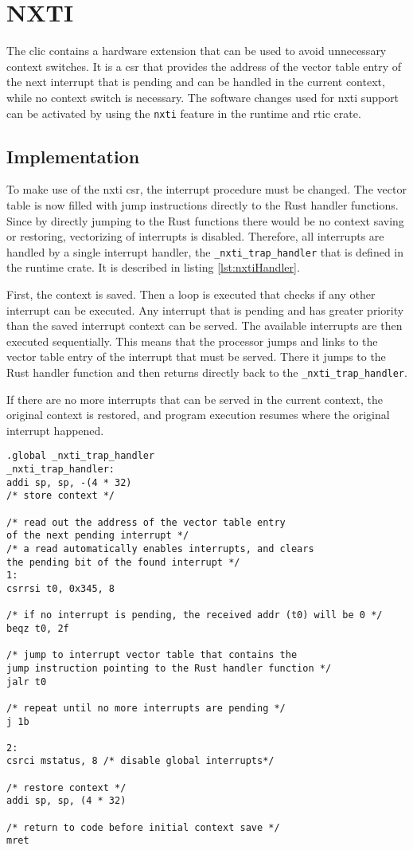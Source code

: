 \section{NXTI}
The \gls{clic} contains a hardware extension that can be used to avoid unnecessary context switches. It is a \gls{csr} that provides the address of the vector table entry of the next interrupt that is pending and can be handled in the current context, while no context switch is necessary. The software changes used for nxti support can be activated by using the \texttt{nxti} feature in the runtime and \gls{rtic} crate.

\subsection{Implementation}
To make use of the nxti \gls{csr}, the interrupt procedure must be changed. The vector table is now filled with jump instructions directly to the Rust handler functions. Since by directly jumping to the Rust functions there would be no context saving or restoring, vectorizing of interrupts is disabled. Therefore, all interrupts are handled by a single interrupt handler, the \texttt{_nxti_trap_handler} that is defined in the runtime crate. It is described in listing \ref{lst:nxtiHandler}.

First, the context is saved. Then a loop is executed that checks if any other interrupt can be executed. Any interrupt that is pending and has greater priority than the saved interrupt context can be served. The available interrupts are then executed sequentially. This means that the processor jumps and links to the vector table entry of the interrupt that must be served. There it jumps to the Rust handler function and then returns directly back to the \texttt{_nxti_trap_handler}.

If there are no more interrupts that can be served in the current context, the original context is restored, and program execution resumes where the original interrupt happened.

\begin{lstlisting}[language={[RISC-V]Assembler}, caption={Nxti Trap Handler}, label={lst:nxtiHandler}]
.global _nxti_trap_handler
_nxti_trap_handler:
addi sp, sp, -(4 * 32)
/* store context */

/* read out the address of the vector table entry
of the next pending interrupt */
/* a read automatically enables interrupts, and clears
the pending bit of the found interrupt */
1:
csrrsi t0, 0x345, 8

/* if no interrupt is pending, the received addr (t0) will be 0 */
beqz t0, 2f

/* jump to interrupt vector table that contains the
jump instruction pointing to the Rust handler function */
jalr t0

/* repeat until no more interrupts are pending */
j 1b

2:
csrci mstatus, 8 /* disable global interrupts*/

/* restore context */
addi sp, sp, (4 * 32)

/* return to code before initial context save */
mret
\end{lstlisting}


